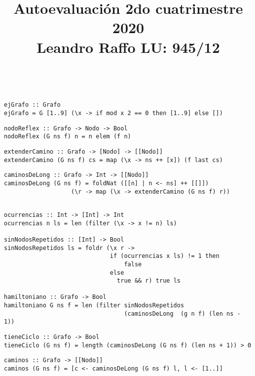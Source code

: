 \documentclass[leqno, 12pt, twoside, letterpaper]{book}
\date{\vspace{-5ex}}
\title{Autoevaluación 2do cuatrimestre 2020 \\ \Large Leandro Raffo LU: 945/12 }
\begin{document}
\maketitle
\tableofcontents

\newpage

\\


\begin{verbatim}
ejGrafo :: Grafo
ejGrafo = G [1..9] (\x -> if mod x 2 == 0 then [1..9] else [])
\end{verbatim}

\begin{verbatim}
nodoReflex :: Grafo -> Nodo -> Bool
nodoReflex (G ns f) n = n elem (f n)
\end{verbatim}

\begin{verbatim}
extenderCamino :: Grafo -> [Nodo] -> [[Nodo]]
extenderCamino (G ns f) cs = map (\x -> ns ++ [x]) (f last cs)
\end{verbatim}

\begin{verbatim}
caminosDeLong :: Grafo -> Int -> [[Nodo]]
caminosDeLong (G ns f) = foldNat ([[n] | n <- ns] ++ [[]]) 
				   (\r -> map (\x -> extenderCamino (G ns f) r)) 
\end{verbatim}

\begin{verbatim}

ocurrencias :: Int -> [Int] -> Int
ocurrencias n ls = len (filter (\x -> x != n) ls)

sinNodosRepetidos :: [Int] -> Bool
sinNodosRepetidos ls = foldr (\x r ->
                              if (ocurrencias x ls) != 1 then
                                  false
                              else
                                true && r) true ls

hamiltoniano :: Grafo -> Bool
hamiltoniano G ns f = len (filter sinNodosRepetidos
                                  (caminosDeLong  (g n f) (len ns - 1))
\end{verbatim}

\begin{verbatim}
tieneCiclo :: Grafo -> Bool
tieneCiclo (G ns f) = length (caminosDeLong (G ns f) (len ns + 1)) > 0
\end{verbatim}


\begin{verbatim}
caminos :: Grafo -> [[Nodo]]
caminos (G ns f) = [c <- caminosDeLong (G ns f) l, l <- [1..]]
\end{verbatim}
\end{document}
